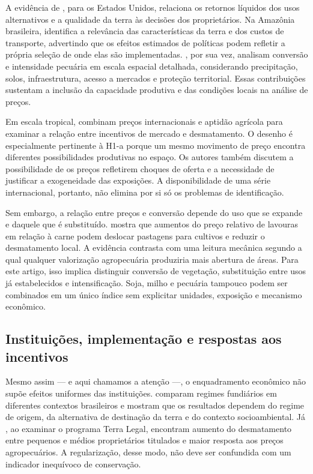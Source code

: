 A evidência de , para os Estados Unidos, relaciona os retornos líquidos dos usos alternativos e a qualidade da terra às decisões dos proprietários. Na Amazônia brasileira,  identifica a relevância das características da terra e dos custos de transporte, advertindo que os efeitos estimados de políticas podem refletir a própria seleção de onde elas são implementadas. , por sua vez, analisam conversão e intensidade pecuária em escala espacial detalhada, considerando precipitação, solos, infraestrutura, acesso a mercados e proteção territorial. Essas contribuições sustentam a inclusão da capacidade produtiva e das condições locais na análise de preços.

Em escala tropical,  combinam preços internacionais e aptidão agrícola para examinar a relação entre incentivos de mercado e desmatamento. O desenho é especialmente pertinente à H1-a porque um mesmo movimento de preço encontra diferentes possibilidades produtivas no espaço. Os autores também discutem a possibilidade de os preços refletirem choques de oferta e a necessidade de justificar a exogeneidade das exposições. A disponibilidade de uma série internacional, portanto, não elimina por si só os problemas de identificação.

Sem embargo, a relação entre preços e conversão depende do uso que se expande e daquele que é substituído.  mostra que aumentos do preço relativo de lavouras em relação à carne podem deslocar pastagens para cultivos e reduzir o desmatamento local. A evidência contrasta com uma leitura mecânica segundo a qual qualquer valorização agropecuária produziria mais abertura de áreas. Para este artigo, isso implica distinguir conversão de vegetação, substituição entre usos já estabelecidos e intensificação. Soja, milho e pecuária tampouco podem ser combinados em um único índice sem explicitar unidades, exposição e mecanismo econômico.

\subsection{Instituições, implementação e respostas aos incentivos}

Mesmo assim --- e aqui chamamos a atenção ---, o enquadramento econômico não supõe efeitos uniformes das instituições.  comparam regimes fundiários em diferentes contextos brasileiros e mostram que os resultados dependem do regime de origem, da alternativa de destinação da terra e do contexto socioambiental. Já , ao examinar o programa Terra Legal, encontram aumento do desmatamento entre pequenos e médios proprietários titulados e maior resposta aos preços agropecuários. A regularização, desse modo, não deve ser confundida com um indicador inequívoco de conservação.

